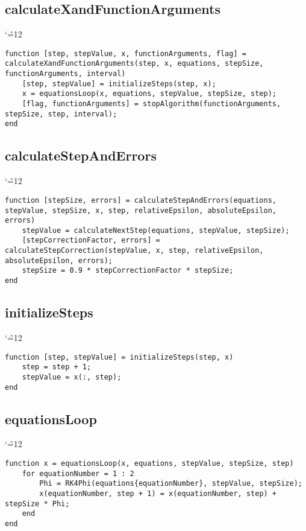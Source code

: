 \documentclass[12pt]{report}
\newenvironment{simplechar}{%
   \catcode`\^=12
}{}
\begin{document}
\subsection{calculateXandFunctionArguments}
\begin{simplechar}
\begin{lstlisting}
function [step, stepValue, x, functionArguments, flag] = calculateXandFunctionArguments(step, x, equations, stepSize, functionArguments, interval)
    [step, stepValue] = initializeSteps(step, x);
    x = equationsLoop(x, equations, stepValue, stepSize, step);
    [flag, functionArguments] = stopAlgorithm(functionArguments, stepSize, step, interval);
end
\end{lstlisting}
\end{simplechar}

\subsection{calculateStepAndErrors}
\begin{simplechar}
\begin{lstlisting}
function [stepSize, errors] = calculateStepAndErrors(equations, stepValue, stepSize, x, step, relativeEpsilon, absoluteEpsilon, errors)
    stepValue = calculateNextStep(equations, stepValue, stepSize);
    [stepCorrectionFactor, errors] = calculateStepCorrection(stepValue, x, step, relativeEpsilon, absoluteEpsilon, errors);
    stepSize = 0.9 * stepCorrectionFactor * stepSize;
end
\end{lstlisting}
\end{simplechar}

\subsection{initializeSteps}
\begin{simplechar}
\begin{lstlisting}
function [step, stepValue] = initializeSteps(step, x)
    step = step + 1;
    stepValue = x(:, step);
end
\end{lstlisting}
\end{simplechar}

\subsection{equationsLoop}
\begin{simplechar}
\begin{lstlisting}
function x = equationsLoop(x, equations, stepValue, stepSize, step)
    for equationNumber = 1 : 2
        Phi = RK4Phi(equations{equationNumber}, stepValue, stepSize);
        x(equationNumber, step + 1) = x(equationNumber, step) + stepSize * Phi;
    end
end

\end{lstlisting}
\end{simplechar}
\end{document}
